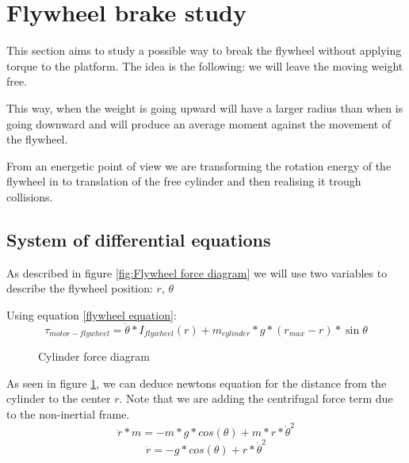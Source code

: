 \section{Flywheel brake study}

This section aims to study a possible way to break the flywheel without applying torque to the platform. The idea is the following: we will leave the moving weight free.

This way, when the weight is going upward will have a larger radius than when is going downward and will produce an average moment against the movement of the flywheel.

From an energetic point of view we are transforming the rotation energy of the flywheel in to translation of the free cylinder and then realising it trough collisions.
\subsection{System of differential equations}
As described in figure \ref{fig:Flywheel force diagram} we will use two variables to describe the flywheel position: $r$, $\theta$ 

Using equation \ref{flywheel equation}:
\[\tau_{motor-flywheel} = \ddot{\theta}*I_{flywheel}(r) + m_{cylinder} * g * (r_{max} - r) * \sin{\theta}  \]
\begin{figure}[H]
	\centering
	\caption{Cylinder force diagram}
	\label{fig:Cylinder force diagram}
\end{figure}

As seen in figure \ref{fig:Cylinder force diagram}, we can deduce newtons equation for the distance from the cylinder to the center $r$. Note that we are adding the centrifugal force term due to the non-inertial frame.
\[\ddot{r} * m = -m * g * cos(\theta) + m * r * \dot{\theta}^2 \]
\[\ddot{r} = -g * cos(\theta) + r * \dot{\theta}^2 \]

